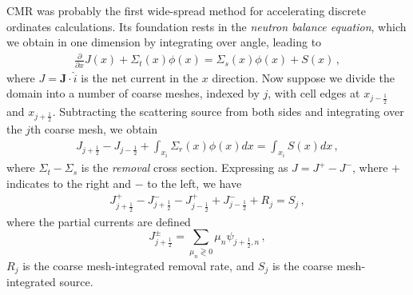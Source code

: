 CMR was probably the first wide-spread method for accelerating discrete 
ordinates calculations.  Its foundation rests in the \textit{neutron balance 
equation}, which we obtain in one dimension by integrating
 over angle, leading to
\begin{equation}
\begin{split}
 \frac{\partial }{\partial x}J(x) + \Sigma_t(x) \phi(x) 
   = \Sigma_{s}(x)\phi(x) + S(x) \, ,
\end{split}
\label{eq:cmr_balance}
\end{equation}
where $J = \mathbf{J}\cdot \hat{i}$ is the net current in the $x$ direction. Now 
suppose we divide the domain into a number of coarse meshes, indexed by $j$, 
with cell edges at $x_{j-\frac{1}{2}}$ and $x_{j+\frac{1}{2}}$.  Subtracting the 
scattering source from both sides and integrating over the $j$th coarse mesh, we 
obtain
\begin{equation}
\begin{split}
 J_{j+\frac{1}{2}} - J_{j-\frac{1}{2}}  + \int_{x_i} \Sigma_r(x) \phi(x) dx = 
\int_{x_i} S(x) dx \, ,
\end{split}
\label{eq:coarsebalance}
\end{equation}
where $\Sigma_t - \Sigma_s$ is the \textit{removal} cross section.
Expressing  as $J = J^+ - J^-$, where $+$ indicates to 
the right and $-$ to the left, we have
\begin{equation}
\begin{split}
 J^+_{j+\frac{1}{2}}- J^-_{j+\frac{1}{2}} - J^+_{j-\frac{1}{2}} + 
J^-_{j-\frac{1}{2}} + R_j = S_j \, ,
\end{split}
\label{eq:cmrbalance}
\end{equation}
where the partial currents are defined
\begin{equation}
 J^{\pm}_{j+\frac{1}{2}} = \sum_{\mu_n \gtrless 0} \mu_n \psi_{j+\frac{1}{2},n} 
\, ,
\end{equation}
$R_j$ is the coarse mesh-integrated removal rate, and $S_j$ is the coarse 
mesh-integrated source.  


